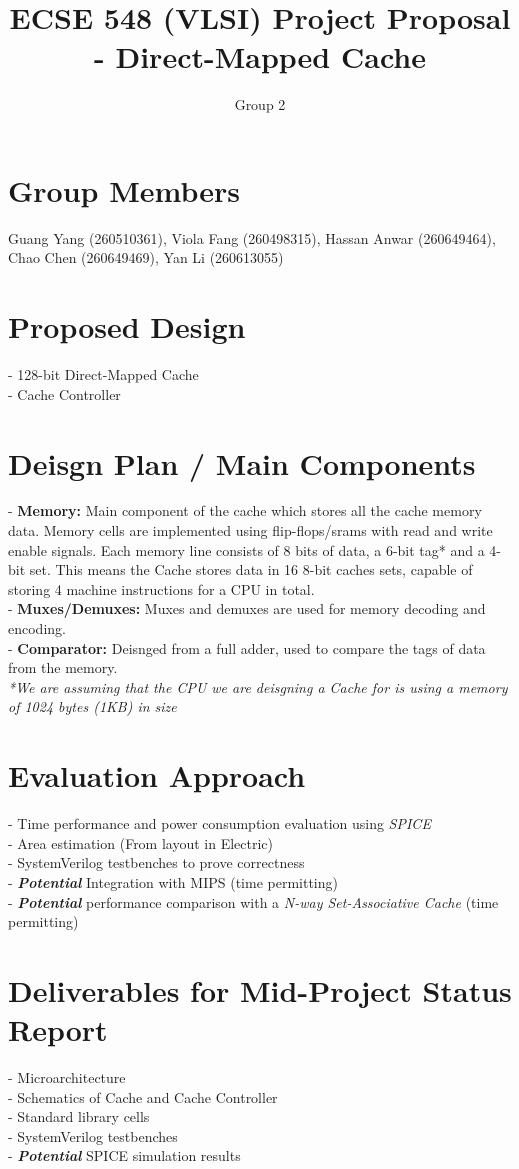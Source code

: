 \documentclass{article}
\begin{document}
\title{ECSE 548 (VLSI) Project Proposal - Direct-Mapped Cache}
\date{}
\author{Group 2}
\maketitle

\section{Group Members}

Guang Yang (260510361), Viola Fang (260498315), Hassan Anwar (260649464), Chao Chen (260649469), Yan Li (260613055)

\section{Proposed Design}

- 128-bit Direct-Mapped Cache \\
- Cache Controller

\section{Deisgn Plan / Main Components}

- \textbf{Memory:} Main component of the cache which stores all the cache memory data. Memory cells are implemented using flip-flops/srams with read and write enable signals. Each memory line consists of 8 bits of data, a 6-bit tag* and a 4-bit set. This means the Cache stores data in 16 8-bit caches sets, capable of storing 4 machine instructions for a CPU in total. \\
- \textbf{Muxes/Demuxes:} Muxes and demuxes are used for memory decoding and encoding. \\
- \textbf{Comparator:} Deisnged from a full adder, used to compare the tags of data from the memory. \\
\textit{*We are assuming that the CPU we are deisgning a Cache for is using a memory of 1024 bytes (1KB) in size}

\section{Evaluation Approach}

- Time performance and power consumption evaluation using \textit{SPICE} \\
- Area estimation (From layout in Electric) \\
- SystemVerilog testbenches to prove correctness \\
- \textbf{\textit{Potential}} Integration with MIPS (time permitting) \\
- \textbf{\textit{Potential}} performance comparison with a \textit{N-way Set-Associative Cache} (time permitting) \\

\section{Deliverables for Mid-Project Status Report}

- Microarchitecture\\
- Schematics of Cache and Cache Controller \\
- Standard library cells \\
- SystemVerilog testbenches \\
- \textbf{\textit{Potential}} SPICE simulation results
\end{document}
